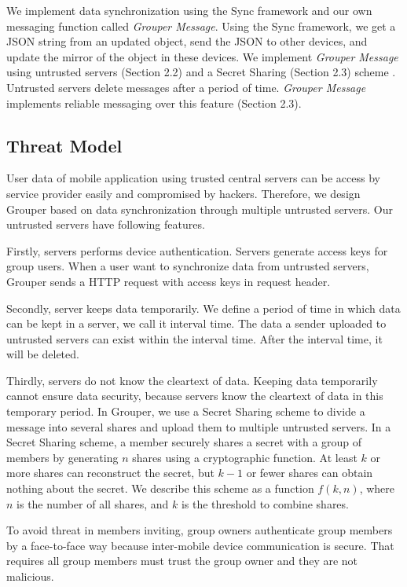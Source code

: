 \documentclass[twocolumn,10pt]{article}
\begin{document}
We implement data synchronization using the Sync framework\cite{sync} and our own messaging function called \emph{Grouper Message}.
Using the Sync framework, we get a JSON string from an updated object, send the JSON to other devices, and update the mirror of the object in these devices. 
We implement \emph{Grouper Message} using untrusted servers (Section 2.2) and a Secret Sharing (Section 2.3) scheme . 
Untrusted servers delete messages after a period of time. 
\emph{Grouper Message} implements reliable messaging over this feature (Section 2.3).

\subsection{Threat Model}

User data of mobile application using trusted central servers can be access by service provider easily and compromised by hackers. 
Therefore, we design Grouper based on data synchronization through multiple untrusted servers. Our untrusted servers have following features.

Firstly, servers performs device authentication. 
Servers generate access keys for group users. 
When a user want to synchronize data from untrusted servers, Grouper sends a HTTP request with access keys in request header.

Secondly, server keeps data temporarily.
We define a period of time in which data can be kept in a server, we call it interval time. 
The data a sender uploaded to untrusted servers can exist within the interval time. After the interval time, it will be deleted.

Thirdly, servers do not know the cleartext of data. Keeping data temporarily cannot ensure data security, because servers know the cleartext of data in this temporary period. In Grouper, we use a Secret Sharing scheme to divide a message into several shares and upload them to multiple untrusted servers. In a Secret Sharing scheme, a member securely shares a secret with a group of members by generating $n$ shares using a cryptographic function. At least $k$ or more shares can reconstruct the secret, but $k-1$ or fewer shares can obtain nothing about the secret\cite{pang2005new}. We describe this scheme as a function $f(k, n)$, where $n$ is the number of all shares, and $k$ is the threshold to combine shares. 

To avoid threat in members inviting, group owners authenticate group members by a face-to-face way because inter-mobile device communication is secure. That requires all group members must trust the group owner and they are not malicious.
\end{document}

